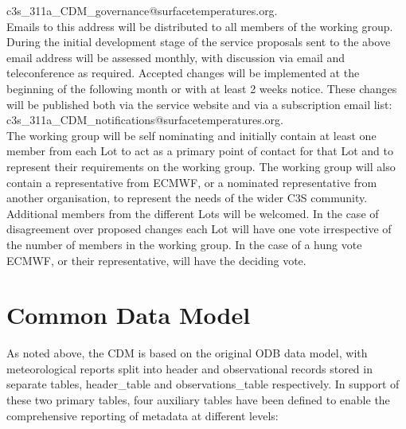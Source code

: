 \documentclass[a4paper,12pt]{article}
\begin{document}
\tabto{2cm} {c3s\_311a\_CDM\_governance}@surfacetemperatures.org.\\

Emails to this address will be distributed to all members of the working group. \\

During the initial development stage of the service proposals sent to the above email address will be assessed monthly, with discussion via email and teleconference as required. Accepted changes will be implemented at the beginning of the following month or with at least 2 weeks notice. These changes will be published both via the service website and via a subscription email list:\\

\tabto{2 cm} {c3s\_311a\_CDM\_notifications}@surfacetemperatures.org.\\

The working group will be self nominating and initially contain at least one member from each Lot to act as a primary point of contact for that Lot and to represent their requirements on the working group. The working group will also contain a representative from ECMWF, or a nominated representative from another organisation, to represent the needs of the wider C3S community. Additional members from the different Lots will be welcomed. In the case of disagreement over proposed changes each Lot will have one vote irrespective of the number of members in the working group. In the case of a hung vote ECMWF, or their representative, will have the deciding vote.\\

\section {Common Data Model}
As noted above, the CDM is based on the original ODB data model, with meteorological reports split into header and observational records stored in separate tables, header\_table and observations\_table respectively. In support of these two primary tables, four auxiliary tables have been defined to enable the comprehensive reporting of metadata at different levels:\\
\end{document}
